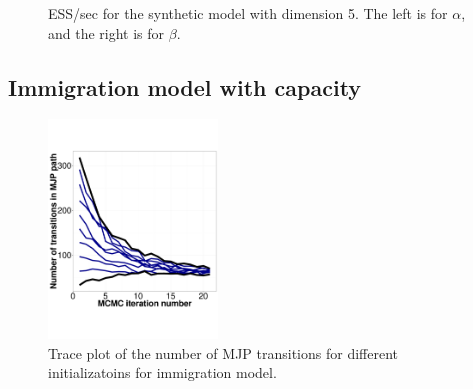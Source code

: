 \begin{figure}[H]
\begin{minipage}[hp]{0.45\linewidth}
    \vspace{-0 in}
  \end{minipage}
    \caption{ESS/sec for the synthetic model with dimension 5. The left is for 
    $\alpha$, and the right is for $\beta$.}
     \label{fig:ESS_EXP_D5}
  \end{figure}

\subsection{Immigration model with capacity}
\begin{figure}[H]
  \begin{minipage}[hp]{0.85\linewidth}
  \centering
    \includegraphics [width=0.40\textwidth, angle=0]{figs/q3_k2_path_transition.pdf}
    \vspace{-0 in}
    \caption{Trace plot of the number of MJP transitions for different initializatoins for immigration model.}
     \label{fig:ESS_Q_TRANSITION}
  \end{minipage}
\end{figure}

